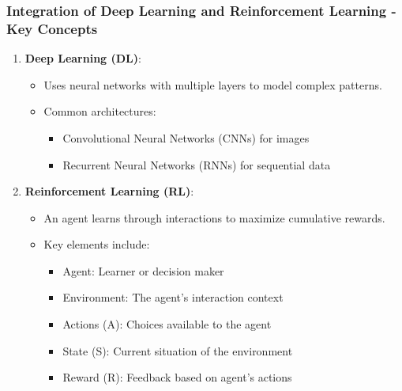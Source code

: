 \documentclass[aspectratio=169]{beamer}
\begin{document}
\begin{frame}[fragile]
    \frametitle{Integration of Deep Learning and Reinforcement Learning - Key Concepts}
    \begin{enumerate}
        \item \textbf{Deep Learning (DL)}:
        \begin{itemize}
            \item Uses neural networks with multiple layers to model complex patterns.
            \item Common architectures: 
            \begin{itemize}
                \item Convolutional Neural Networks (CNNs) for images
                \item Recurrent Neural Networks (RNNs) for sequential data
            \end{itemize}
        \end{itemize}
        
        \item \textbf{Reinforcement Learning (RL)}:
        \begin{itemize}
            \item An agent learns through interactions to maximize cumulative rewards.
            \item Key elements include:
            \begin{itemize}
                \item Agent: Learner or decision maker
                \item Environment: The agent’s interaction context
                \item Actions (A): Choices available to the agent
                \item State (S): Current situation of the environment
                \item Reward (R): Feedback based on agent’s actions
            \end{itemize}
        \end{itemize}
    \end{enumerate}
\end{frame}
\end{document}
